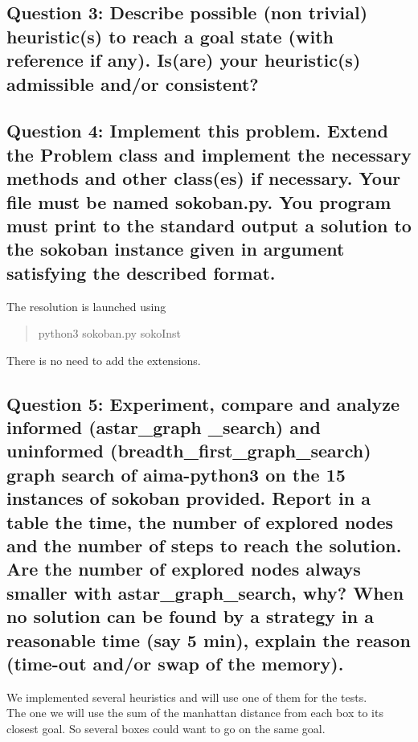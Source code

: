 \documentclass[a4paper,10pt]{article}
\begin{document}
		\subsection{Question 3: Describe possible (non trivial) heuristic(s) to reach a goal state (with reference if any). Is(are) your heuristic(s) admissible and/or consistent?}
		
		\subsection{Question 4: Implement this problem. Extend the Problem class and implement the necessary methods and other class(es) if necessary. Your file must be named sokoban.py. You program must print to the standard output a solution to the sokoban instance given in argument satisfying the described format.}
			The resolution is launched using 
			\begin{quote}
				python3 sokoban.py sokoInst 
			\end{quote}
			There is no need to add the extensions.

		\subsection{Question 5: Experiment, compare and analyze informed (astar\_graph \_search) and uninformed (breadth\_first\_graph\_search) graph search of aima-python3 on the 15 instances of sokoban provided. Report in a table the time, the number of explored nodes and the number of steps to reach the solution. Are the number of explored nodes always smaller with astar\_graph\_search, why? When no solution can be found by a strategy in a reasonable time (say 5 min), explain the reason (time-out and/or swap of the memory).}
			We implemented several heuristics and will use one of them for the tests. \\
			The one we will use the sum of the manhattan distance from each box to its closest goal. So several boxes could want to go on the same goal.
			
\end{document}
